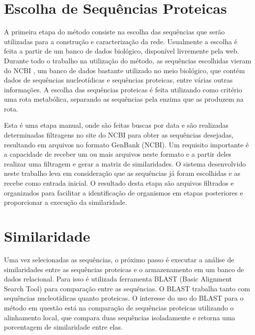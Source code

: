 \section{Escolha de Sequências Proteicas} \label{sec:escseq}

A primeira etapa do método consiste na escolha das sequências que serão utilizadas para a construção e caracterização da rede.
Usualmente a escolha é feita a partir de um banco de dados biológico, disponível livremente pela web. Durante todo o trabalho na utilização
do método, as sequências escolhidas vieram do NCBI \cite{ncbi}, um banco de dados bastante utilizado no meio biológico, que contém dados de sequências
nucleotídicas e sequências proteicas, entre várias outras informações. A escolha das sequências proteicas é feita utilizando como critério
uma rota metabólica, separando as sequências pela enzima que as produzem na rota.


Esta é uma etapa manual, onde são feitas buscas por data e são realizadas determinadas filtragens no site do NCBI para obter as sequências desejadas, 
resultando em arquivos no formato GenBank (NCBI). Um requisito importante é a capacidade de receber um ou mais arquivos neste formato e a partir deles
realizar uma filtragem e gerar a matriz de similaridades. O sistema desenvolvido neste trabalho leva em consideração que as sequências já foram escolhidas
e as recebe como entrada inicial. O resultado desta etapa são arquivos filtrados e organizados para facilitar a identificação de organismos em etapas
posteriores e proporcionar a execução da similaridade.

\section{Similaridade} \label{sec:similaridade}

Uma vez selecionadas as sequências, o próximo passo é executar a análise de similaridades entre as sequências proteicas e o armazenamento em um banco
de dados relacional. Para isso é utilizada ferramenta BLAST (Basic Alignment Search Tool) \cite{blast1997} para comparação entre as sequências. O BLAST
trabalha tanto com sequências nucleotídicas quanto proteicas. O interesse do uso do BLAST para o método em questão está na comparação de sequências proteicas
utilizando o alinhamento local, que compara duas sequências isoladamente e retorna uma porcentagem de similaridade entre elas.

